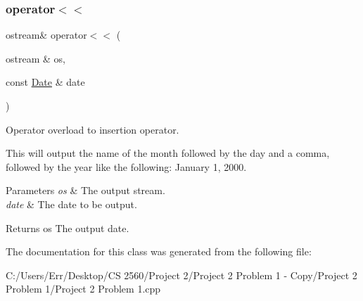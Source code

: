 \subsubsection{\texorpdfstring{operator$<$$<$}{operator<<}}
{\footnotesize\ttfamily ostream\& operator$<$$<$ (\begin{DoxyParamCaption}\item[{ostream \&}]{os,  }\item[{const \mbox{\hyperlink{class_date}{Date}} \&}]{date }\end{DoxyParamCaption})\hspace{0.3cm}{\ttfamily [friend]}}



Operator overload to insertion operator. 

This will output the name of the month followed by the day and a comma, followed by the year like the following\+: January 1, 2000.


\begin{DoxyParams}{Parameters}
{\em os} & The output stream. \\
\hline
{\em date} & The date to be output.\\
\hline
\end{DoxyParams}
\begin{DoxyReturn}{Returns}
os The output date. 
\end{DoxyReturn}


The documentation for this class was generated from the following file\+:\begin{DoxyCompactItemize}
\item 
C\+:/\+Users/\+Err/\+Desktop/\+C\+S 2560/\+Project 2/\+Project 2 Problem 1 -\/ Copy/\+Project 2 Problem 1/Project 2 Problem 1.\+cpp\end{DoxyCompactItemize}
